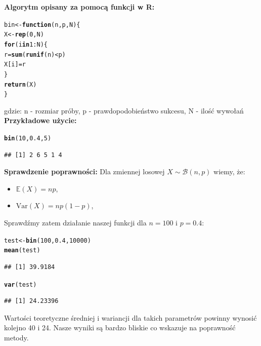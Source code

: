 \documentclass[12pt]{mwart}\usepackage[]{graphicx}\usepackage[]{color}
\makeatletter
\newcommand{\hlnum}[1]{\textcolor[rgb]{0.686,0.059,0.569}{#1}}%
\newcommand{\hlopt}[1]{\textcolor[rgb]{0,0,0}{#1}}%
\newcommand{\hlstd}[1]{\textcolor[rgb]{0.345,0.345,0.345}{#1}}%
\newcommand{\hlkwa}[1]{\textcolor[rgb]{0.161,0.373,0.58}{\textbf{#1}}}%
\newcommand{\hlkwb}[1]{\textcolor[rgb]{0.69,0.353,0.396}{#1}}%
\newcommand{\hlkwc}[1]{\textcolor[rgb]{0.333,0.667,0.333}{#1}}%
\newcommand{\hlkwd}[1]{\textcolor[rgb]{0.737,0.353,0.396}{\textbf{#1}}}%
\newenvironment{kframe}{%
 \def\at@end@of@kframe{}%
 \ifinner\ifhmode%
  \def\at@end@of@kframe{\end{minipage}}%
  \begin{minipage}{\columnwidth}%
 \fi\fi%
 \def\FrameCommand##1{\hskip\@totalleftmargin \hskip-\fboxsep
 \colorbox{shadecolor}{##1}\hskip-\fboxsep
     \hskip-\linewidth \hskip-\@totalleftmargin \hskip\columnwidth}%
 \MakeFramed {\advance\hsize-\width
   \@totalleftmargin\z@ \linewidth\hsize
   \@setminipage}}%
 {\par\unskip\endMakeFramed%
 \at@end@of@kframe}
\newenvironment{knitrout}{}{} %
\makeatother
\begin{document}
\textbf{Algorytm opisany za pomocą funkcji w R:}
\begin{knitrout}
\color{fgcolor}\begin{kframe}
\begin{alltt}
\hlstd{bin} \hlkwb{<-} \hlkwa{function}\hlstd{(}\hlkwc{n}\hlstd{,}\hlkwc{p}\hlstd{,}\hlkwc{N}\hlstd{)\{}
  \hlstd{X} \hlkwb{<-} \hlkwd{rep}\hlstd{(}\hlnum{0}\hlstd{,N)}
  \hlkwa{for} \hlstd{(i} \hlkwa{in} \hlnum{1}\hlopt{:}\hlstd{N) \{}
    \hlstd{r} \hlkwb{=} \hlkwd{sum}\hlstd{(}\hlkwd{runif}\hlstd{(n)} \hlopt{<} \hlstd{p)}
    \hlstd{X[i]} \hlkwb{=} \hlstd{r}
  \hlstd{\}}
  \hlkwd{return}\hlstd{(X)}
\hlstd{\}}
\end{alltt}
\end{kframe}
\end{knitrout}
gdzie: n - rozmiar próby, p - prawdopodobieństwo sukcesu, N - ilość wywołań\newline
\textbf{Przykładowe użycie:}
\begin{knitrout}
\color{fgcolor}\begin{kframe}
\begin{alltt}
\hlkwd{bin}\hlstd{(}\hlnum{10}\hlstd{,}\hlnum{0.4}\hlstd{,}\hlnum{5}\hlstd{)}
\end{alltt}
\begin{verbatim}
## [1] 2 6 5 1 4
\end{verbatim}
\end{kframe}
\end{knitrout}


\textbf{Sprawdzenie poprawności:}\newline
Dla zmiennej losowej $X \sim \mathcal{B}(n, p)$ wiemy, że:
\begin{itemize}
  \item[] $\mathbb{E}(X) = np$, 
  \item[] $\text{Var}(X)= np(1-p)$,
\end{itemize} 
Sprawdźmy zatem działanie naszej funkcji dla $n = 100$ i $p = 0.4$:
\begin{knitrout}
\color{fgcolor}\begin{kframe}
\begin{alltt}
\hlstd{test} \hlkwb{<-} \hlkwd{bin}\hlstd{(}\hlnum{100}\hlstd{,}\hlnum{0.4}\hlstd{,}\hlnum{10000}\hlstd{)}
\hlkwd{mean}\hlstd{(test)}
\end{alltt}
\begin{verbatim}
## [1] 39.9184
\end{verbatim}
\begin{alltt}
\hlkwd{var}\hlstd{(test)}
\end{alltt}
\begin{verbatim}
## [1] 24.23396
\end{verbatim}
\end{kframe}
\end{knitrout}
Wartości teoretyczne średniej i wariancji dla takich parametrów powinny wynosić kolejno 40 i 24. Nasze wyniki są bardzo bliskie co wskazuje na poprawność metody.
\newpage
\end{document}

